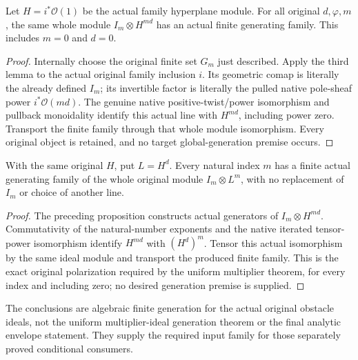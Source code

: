 \begin{proposition}
\label{prop:c0n-original-obstacle-finite-generation}
\leanok
Let $H=i^*\mathcal O(1)$ be the actual family hyperplane module.  For all
original $d,\varphi,m$, the same whole module $I_m\otimes H^{md}$ has an
actual finite generating family.  This includes $m=0$ and $d=0$.
\end{proposition}
\begin{proof}
Internally choose the original finite set $G_m$ just described.  Apply the
third lemma to the actual original family inclusion $i$.  Its geometric
comap is literally the already defined $I_m$; its invertible factor is
literally the pulled native pole-sheaf power $i^*\mathcal O(md)$.
The genuine native positive-twist/power isomorphism and pullback monoidality
identify this actual line with $H^{md}$, including power zero.  Transport
the finite family through that whole module isomorphism.  Every original
object is retained, and no target global-generation premise occurs.
\end{proof}

\begin{proposition}
\label{prop:c0n-original-polarization-power-generation}
\leanok
With the same original $H$, put $L=H^d$.  Every natural index $m$ has a
finite actual generating family of the whole original module
$I_m\otimes L^m$, with no replacement of $I_m$ or choice of another line.
\end{proposition}
\begin{proof}
The preceding proposition constructs actual generators of
$I_m\otimes H^{md}$.  Commutativity of the natural-number exponents and
the native iterated tensor-power isomorphism identify $H^{md}$ with
$(H^d)^m$.  Tensor this actual isomorphism by the same ideal module and
transport the produced finite family.  This is the exact original
polarization required by the uniform multiplier theorem, for every index
and including zero; no desired generation premise is supplied.
\end{proof}

The conclusions are algebraic finite generation for the actual original
obstacle ideals, not the uniform multiplier-ideal generation theorem or
the final analytic envelope statement.  They supply the required
input family for those separately proved conditional consumers.
